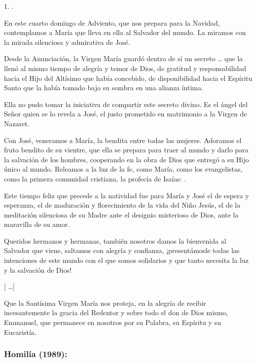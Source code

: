 				\begin{body}
					1. .
					
					En este cuarto domingo de Adviento, que nos prepara para la Navidad, contemplamos a María que lleva en ella al Salvador del mundo. La miramos con la mirada silenciosa y admirativa de José.
					
					Desde la Anunciación, la Virgen María guardó dentro de sí un secreto \ldots{} que la llenó al mismo tiempo de alegría y temor de Dios, de gratitud y responsabilidad hacia el Hijo del Altísimo que había concebido, de disponibilidad hacia el Espíritu Santo que la había tomado bajo su sombra en una alianza íntima.
					
					Ella no pudo tomar la iniciativa de compartir este secreto divino. Es el ángel del Señor quien se lo revela a José, el justo prometido en matrimonio a la Virgen de Nazaret.
					
					Con José, veneramos a María, la bendita entre todas las mujeres. Adoramos el fruto bendito de su vientre, que ella se prepara para traer al mundo y darlo para la salvación de los hombres, cooperando en la obra de Dios que entregó a su Hijo único al mundo. Releamos a la luz de la fe, como María, como los evangelistas, como la primera comunidad cristiana, la profecía de Isaías: .
					
					Este tiempo feliz que precede a la natividad fue para María y José el de espera y esperanza, el de maduración y florecimiento de la vida del Niño Jesús, el de la meditación silenciosa de su Madre ante el designio misterioso de Dios, ante la maravilla de su amor.
					
					Queridos hermanos y hermanas, también nosotros damos la bienvenida al Salvador que viene, saltamos con alegría y confianza, ¡presentámosle todas las intenciones de este mundo con el que somos solidarios y que tanto necesita la luz y la salvación de Dios!
					
					{[} \ldots{}{]}
					
					Que la Santísima Virgen María nos proteja, en la alegría de recibir incesantemente la gracia del Redentor y sobre todo el don de Dios mismo, Emmanuel, que permanece en nosotros por su Palabra, su Espíritu y su Eucaristía.
				\end{body}

			\subsubsection{Homilía (1989):}

